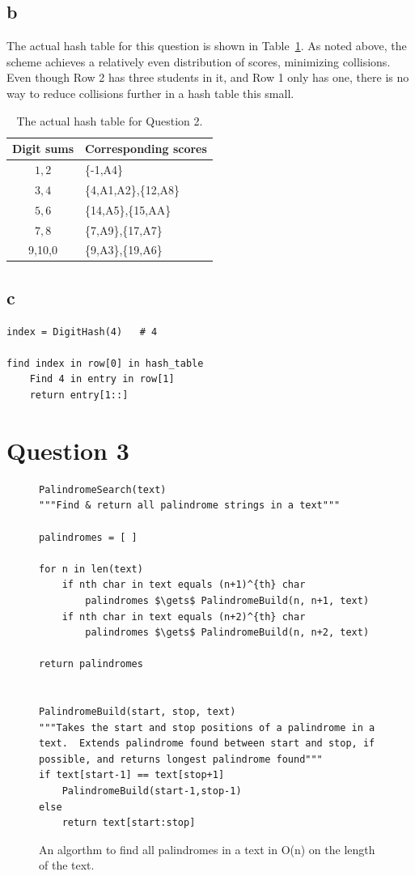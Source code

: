 \documentclass[12pt]{article}
\begin{document}
\subsection*{b} %
The actual hash table for this question is shown in Table~\ref{hashintro}.  As noted above, the scheme achieves a relatively even distribution of scores, minimizing collisions.  Even though Row 2 has three students in it, and Row 1 only has one, there is no way to reduce collisions further in a hash table this small.
\begin{table}[h]
\begin{tabular}{c|l}
Digit sums & Corresponding scores\\\hline
$1, 2$ & \{-1,A4\}\\
$3,4$ & \{4,A1,A2\},\{12,A8\}\\
$5,6$ & \{14,A5\},\{15,AA\}\\
$7,8$ & \{7,A9\},\{17,A7\}\\
9,10,0 & \{9,A3\},\{19,A6\}\\
\end{tabular}
\caption{The actual hash table for Question 2.}
\label{hashintro}
\end{table}


\subsection*{c} %

\begin{lstlisting}
index = DigitHash(4)   # 4

find index in row[0] in hash_table
	Find 4 in entry in row[1]
	return entry[1::]
\end{lstlisting}

\section*{Question 3}


\begin{figure}[hb]
\centering
\begin{lstlisting}
PalindromeSearch(text)
"""Find & return all palindrome strings in a text"""

palindromes = [ ]

for n in len(text)
	if nth char in text equals (n+1)^{th} char
		palindromes $\gets$ PalindromeBuild(n, n+1, text)
	if nth char in text equals (n+2)^{th} char
		palindromes $\gets$ PalindromeBuild(n, n+2, text)

return palindromes


PalindromeBuild(start, stop, text)
"""Takes the start and stop positions of a palindrome in a text.  Extends palindrome found between start and stop, if possible, and returns longest palindrome found"""
if text[start-1] == text[stop+1]
	PalindromeBuild(start-1,stop-1)
else 
	return text[start:stop]
\end{lstlisting}
\caption{An algorthm to find all palindromes in a text in O(n) on the length of the text.}
\label{palindromes}
\end{figure}
\end{document}
